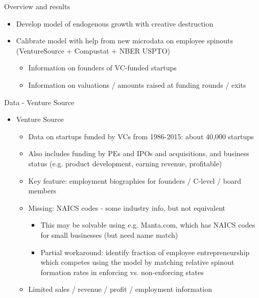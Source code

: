 \documentclass[english,usenames,dvipsnames]{beamer}
\begin{document}
\begin{frame}{Overview and results}
\begin{itemize}
	\item Develop model of endogenous growth with creative destruction
	\item Calibrate model with help from new microdata on employee spinouts (VentureSource + Compustat + NBER USPTO)
	\begin{itemize}
		\item Information on founders of VC-funded startups
		\item Information on valuations / amounts raised at funding rounds / exits
	\end{itemize}
\end{itemize}
\end{frame}

\begin{frame}{Data - Venture Source}
\begin{itemize}
	\item Venture Source
	\begin{itemize}
		\item Data on startups funded by VCs from 1986-2015: about 40,000 startups
		\item Also includes funding by PEs and IPOs and acquisitions, and business status (e.g. product development, earning revenue, profitable)
		\item Key feature: \alert{employment biographies} for founders / C-level / board members
		\item Missing: NAICS codes - some industry info, but not equivalent
		\begin{itemize}
			\item This may be solvable using e.g. Manta.com, which has NAICS codes for small businesses (but need name match)
			\item Partial workaround: identify fraction of employee entrepreneurship which competes using the model by matching relative spinout formation rates in enforcing vs. non-enforcing states
		\end{itemize}
		\item Limited sales / revenue / profit / employment information
	\end{itemize}
\end{itemize}
\end{frame}
\end{document}
